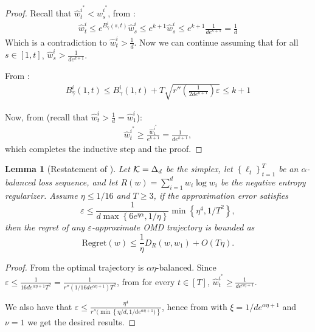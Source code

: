 \documentclass[10pt]{article}
\newtheorem*{lemma*}{Lemma}
\theoremstyle{definition}
\theoremstyle{remark}
\renewcommand{\epsilon}{\varepsilon}
\newcommand{\curly}[1]{ {\left\{ #1 \right\}}}
\newcommand{\roundy}[1]{ {\left( #1 \right)}}
\newcommand{\barconst}{\nu}
\begin{document}
\begin{proof}
Recall that $\hat{w}_t^{i^*} < \hat{w}_s^{i^*}$, from :
\begin{align*}
    \hat{w}_t^i \le e^{B_{\hat{\gamma}}^i(s,t)}\hat{w}_{s}^i \le e^{k+1}\hat{w}_{s}^i \le e^{k+1}\frac{1}{de^{k+1}} = \frac{1}{d}
\end{align*}
Which is a contradiction to $\hat{w}_t^i > \frac{1}{d}$. Now we can continue assuming that for all $s\in [1,t]$, $\hat{w}_s^i > \frac{1}{de^{k+1}}$.

From :
\begin{align*}
    B_{\hat{\gamma}}^i(1,t) \le B_{{\gamma}}^i(1,t) + T\sqrt{r''\roundy{\frac{1}{2de^{k+1}}}\epsilon} \le k+1
\end{align*}

Now, from  (recall that $\hat{w}_t^i > \frac{1}{d} = \hat{w}_1^i$):
\begin{align*}
    \hat{w}_t^{i^*} \ge \frac{\hat{w}_1^{i^*}}{e^{k+1}} = \frac{1}{de^{k+1}},
\end{align*}
which completes the inductive step and the proof.
\end{proof}


\begin{lemma*}[Restatement of ]
Let $\mathcal K=\Delta_d$ be the simplex, let $\curly{\ell_t}_{t=1}^T$ be an $\alpha$-balanced loss sequence, and let $R(w)=\sum_{i=1}^d w_i\log w_i$ be the negative entropy regularizer. Assume $\eta \le 1/16$ and $T\ge 3$,
if the approximation error satisfies 
\[
    \epsilon \le \frac{1}{d \max\curly{6e^{\eta \alpha}, 1/\eta}}\min\curly{\eta^4,1/T^2},
\]
then the regret of any $\epsilon$-approximate OMD trajectory is bounded as
\[
    \mathrm{Regret}(w) \le \frac{1}{\eta} D_R(w, w_1) + O(T \eta).
\]
\end{lemma*}
\begin{proof}
From  the optimal trajectory is $\alpha\eta$-balanced. Since $\epsilon \le \frac{1}{16de^{\alpha\eta+1}T^2} = \frac{1}{r''(1/16de^{\alpha\eta+1})T^2}$, from  for every $t\in [T]$, $\hat{w}_t^{i^*} \ge \frac{1}{de^{\alpha\eta +1}}$. 

We also have that $\epsilon \le \frac{\eta^4}{r''(\min\curly{\eta/d, 1/de^{\alpha\eta+1})}}$, hence 
from  with $\xi=1/de^{\alpha\eta+1}$ and $\barconst=1$ we get the desired results.
\end{proof}
\end{document}
